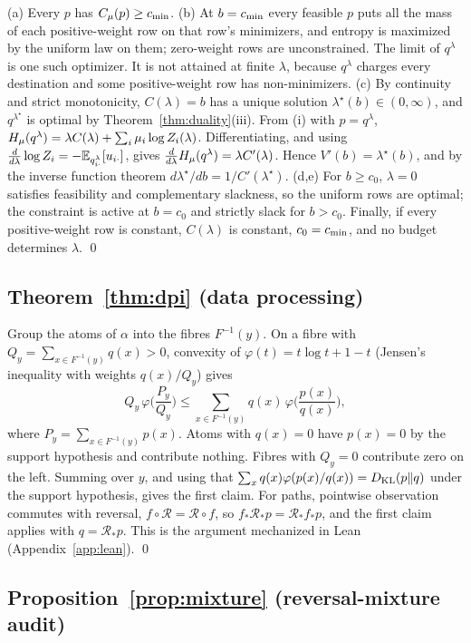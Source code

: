 (a) Every \(p\) has \(C_{\mu}(p)\ge c_{\min}\). (b) At \(b=c_{\min}\) every feasible \(p\) puts all the mass of each positive-weight row on that row's minimizers, and entropy is maximized by the uniform law on them; zero-weight rows are unconstrained. The limit of \(q^\lambda\) is one such optimizer. It is not attained at finite \(\lambda\), because \(q^\lambda\) charges every destination and some positive-weight row has non-minimizers. (c) By continuity and strict monotonicity, \(C(\lambda)=b\) has a unique solution \(\lambda^\star(b)\in(0,\infty)\), and \(q^{\lambda^\star}\) is optimal by Theorem~\ref{thm:duality}(iii). From (i) with \(p=q^\lambda\), \(H_{\mu}(q^\lambda)=\lambda C(\lambda)+\sum_i\mu_i\log Z_i(\lambda)\). Differentiating, and using \(\tfrac{d}{d\lambda}\log Z_i=-\mathbb{E}_{q^\lambda_{i\cdot}}[u_{i\cdot}]\), gives \(\tfrac{d}{d\lambda}H_{\mu}(q^\lambda)=\lambda C'(\lambda)\). Hence \(V'(b)=\lambda^\star(b)\), and by the inverse function theorem \(d\lambda^\star/db=1/C'(\lambda^\star)\). (d,e) For \(b\ge c_0\), \(\lambda=0\) satisfies feasibility and complementary slackness, so the uniform rows are optimal; the constraint is active at \(b=c_0\) and strictly slack for \(b>c_0\). Finally, if every positive-weight row is constant, \(C(\lambda)\) is constant, \(c_0=c_{\min}\), and no budget determines \(\lambda\). \qed

\subsection{Theorem~\ref{thm:dpi} (data processing)}

Group the atoms of \(\alpha\) into the fibres \(F^{-1}(y)\). On a fibre with \(Q_y=\sum_{x\in F^{-1}(y)}q(x)>0\), convexity of \(\varphi(t)=t\log t+1-t\) (Jensen's inequality with weights \(q(x)/Q_y\)) gives
\[
Q_y\,\varphi\!\Big(\frac{P_y}{Q_y}\Big)\le\sum_{x\in F^{-1}(y)}q(x)\,\varphi\!\Big(\frac{p(x)}{q(x)}\Big),
\]
where \(P_y=\sum_{x\in F^{-1}(y)}p(x)\). Atoms with \(q(x)=0\) have \(p(x)=0\) by the support hypothesis and contribute nothing. Fibres with \(Q_y=0\) contribute zero on the left. Summing over \(y\), and using that \(\sum_xq(x)\varphi(p(x)/q(x))=D_{\mathrm{KL}}(p\|q)\) under the support hypothesis, gives the first claim. For paths, pointwise observation commutes with reversal, \(f\circ\mathcal R=\mathcal R\circ f\), so \(f_*\mathcal R_*p=\mathcal R_*f_*p\), and the first claim applies with \(q=\mathcal R_*p\). This is the argument mechanized in Lean (Appendix~\ref{app:lean}). \qed

\subsection{Proposition~\ref{prop:mixture} (reversal-mixture audit)}

